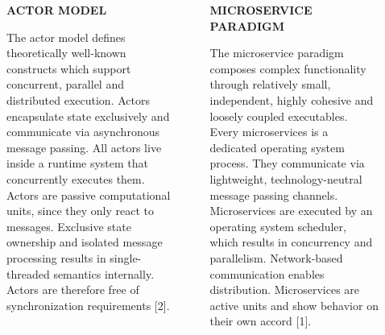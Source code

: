 \documentclass[final,hyperref={pdfpagelabels=true}]{beamer}
\begin{document}
\begin{frame}
  \begin{columns}[t]
    \begin{column}{.04\textwidth}
    \end{column}
    \begin{column}{.43\textwidth}
      \textsf{\textbf{ACTOR MODEL}} \\
      \vspace*{.5\baselineskip}
      {\lmodern
        \begin{justify}
        The actor model defines theoretically well-known constructs which
        support concurrent, parallel and distributed execution. Actors
        encapsulate state exclusively and communicate via asynchronous message
        passing. All actors live inside a runtime system that concurrently
        executes them. Actors are passive computational units, since they only
        react to messages. Exclusive state ownership and isolated message
        processing results in single-threaded semantics internally. Actors are
        therefore free of synchronization requirements {[2]}.
        \end{justify}
      }
    \end{column}
    \begin{column}{.06\textwidth}
    \end{column}
    \begin{column}{.43\textwidth}
      \textsf{\textbf{MICROSERVICE PARADIGM}} \\
      \vspace*{.5\baselineskip}
      {\lmodern
        \begin{justify}
        The microservice paradigm composes complex functionality through
        relatively small, independent, highly cohesive and loosely coupled
        executables. Every microservices is a dedicated operating system
        process. They communicate via lightweight, technology-neutral message
        passing channels. Microservices are executed by an operating system
        scheduler, which results in concurrency and parallelism. Network-based
        communication enables distribution. Microservices are active units and
        show behavior on their own accord {[1]}.
        \end{justify}
      }
    \end{column}
    \begin{column}{.04\textwidth}
    \end{column}
  \end{columns}


\end{frame}
\end{document}
